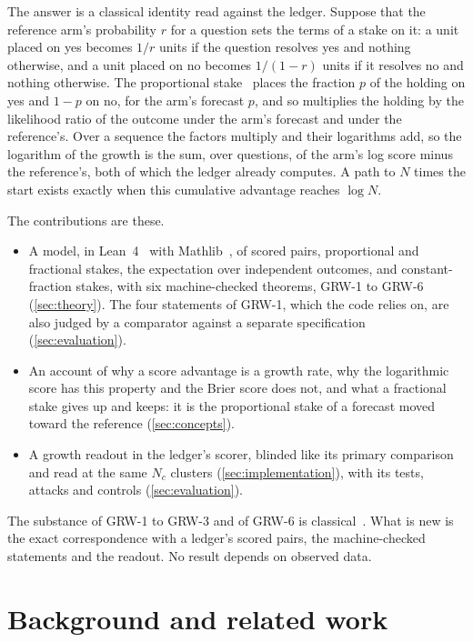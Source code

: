 \documentclass[11pt]{article}
\theoremstyle{plain}
\theoremstyle{definition}
\theoremstyle{remark}
\begin{document}
The answer is a classical identity read against the ledger. Suppose that the reference arm's
probability $r$ for a question sets the terms of a stake on it: a unit placed on yes becomes $1/r$
units if the question resolves yes and nothing otherwise, and a unit placed on no becomes
$1/(1-r)$ units if it resolves no and nothing otherwise. The proportional
stake~\citep{kelly1956,cover2006} places the fraction $p$ of the holding on yes and $1-p$ on no,
for the arm's forecast $p$, and so multiplies the holding by the likelihood ratio of the outcome
under the arm's forecast and under the reference's. Over a sequence the factors multiply and their
logarithms add, so the logarithm of the growth is the sum, over questions, of the arm's log score
minus the reference's, both of which the ledger already computes. A path to $N$ times the start
exists exactly when this cumulative advantage reaches $\log N$.

The contributions are these.
\begin{itemize}
  \item A model, in Lean~4~\citep{moura2021} with Mathlib~\citep{mathlib2020}, of scored pairs,
    proportional and fractional stakes, the expectation over independent outcomes, and
    constant-fraction stakes, with six machine-checked theorems, GRW-1 to GRW-6
    (\cref{sec:theory}). The four statements of GRW-1, which the code relies on, are also judged
    by a comparator against a separate specification (\cref{sec:evaluation}).
  \item An account of why a score advantage is a growth rate, why the logarithmic score has this
    property and the Brier score does not, and what a fractional stake gives up and keeps: it is
    the proportional stake of a forecast moved toward the reference (\cref{sec:concepts}).
  \item A growth readout in the ledger's scorer, blinded like its primary comparison and read
    at the same $N_c$ clusters (\cref{sec:implementation}), with its tests, attacks and controls
    (\cref{sec:evaluation}).
\end{itemize}
The substance of GRW-1 to GRW-3 and of GRW-6 is classical~\citep{kelly1956,breiman1961,
thorp1969,cover2006}. What is new is the exact correspondence with a ledger's scored pairs, the
machine-checked statements and the readout. No result depends on observed data.

\section{Background and related work}
\label{sec:background}
\end{document}
